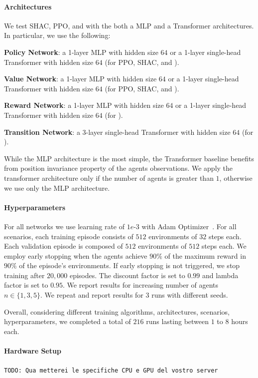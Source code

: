 \paragraph{Architectures}
We test SHAC, PPO, and \fname{} with the both a MLP and a Transformer architectures. In particular, we use the following:
\begin{compactitem}
    \item \textbf{Policy Network}: a 1-layer MLP with hidden size $64$ or a 1-layer single-head Transformer with hidden size $64$ (for PPO, SHAC, and \fname{}).
    \item \textbf{Value Network}:  a 1-layer MLP with hidden size $64$ or a 1-layer single-head Transformer with hidden size $64$ (for PPO, SHAC, and \fname{}).
    \item \textbf{Reward Network}: a 1-layer MLP with hidden size $64$ or a 1-layer single-head Transformer with hidden size $64$ (for \fname{}).
    \item \textbf{Transition Network}: a 3-layer single-head Transformer with hidden size $64$ (for \fname{}).
\end{compactitem}
While the MLP architecture is the most simple, the Transformer baseline benefits from position invariance property of the agents observations. We apply the transformer architecture only if the number of agents is greater than $1$, otherwise we use only the MLP architecture. 

\paragraph{Hyperparameters}
For all networks we use learning rate of $1e\text{-}3$ with Adam Optimizer~\cite{Kingma14}. For all scenarios, each training episode consists of $512$ environments of $32$ steps each. Each validation episode is composed of $512$ environments of $512$ steps each. We employ early stopping when the agents achieve $90\%$ of the maximum reward in $90\%$ of the episode's environments. If early stopping is not triggered, we stop training after $20,000$ episodes. The discount factor is set to $0.99$ and lambda factor is set to $0.95$. We report results for increasing number of agents $n\in\{1,3,5\}$. We repeat and report results for $3$ runs with different seeds.

Overall, considering different training algorithms, architectures, scenarios, hyperparameters, we completed a total of $216$ runs lasting between $1$ to $8$ hours each. 

\paragraph{Hardware Setup}
\texttt{\color{DarkOrchid}TODO: Qua metterei le specifiche CPU e GPU del vostro server}

